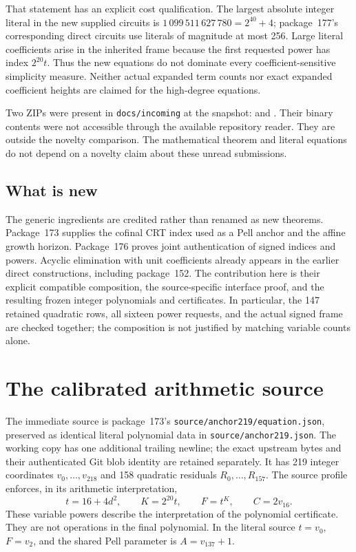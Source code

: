 \documentclass[11pt]{article}
\theoremstyle{definition}\newtheorem{definition}[theorem]{Definition}
\theoremstyle{remark}\newtheorem{remark}[theorem]{Remark}
\begin{document}
That statement has an explicit cost qualification. The largest absolute
integer literal in the new supplied circuits is
$1\,099\,511\,627\,780=2^{40}+4$; package~177's corresponding direct
circuits use literals of magnitude at most 256. Large literal
coefficients arise in the inherited frame because the first requested
power has index $2^{20}t$. Thus the new equations do not dominate every
coefficient-sensitive simplicity measure. Neither actual expanded term
counts nor exact expanded coefficient heights are claimed for the
high-degree equations.

Two ZIPs were present in \texttt{docs/incoming} at the snapshot:
 and
.
Their binary contents were not accessible through the available
repository reader. They are outside the novelty comparison. The
mathematical theorem and literal equations do not depend on a novelty
claim about these unread submissions.

\subsection{What is new}
The generic ingredients are credited rather than renamed as new
theorems. Package~173 supplies the cofinal CRT index used as a Pell
anchor and the affine growth horizon. Package~176 proves joint
authentication of signed indices and powers. Acyclic elimination with
unit coefficients already appears in the earlier direct constructions,
including package~152. The contribution here is their explicit compatible
composition, the source-specific interface proof, and the resulting
frozen integer polynomials and certificates. In particular, the
147 retained quadratic rows, all sixteen power requests, and the actual
signed frame are checked together; the composition is not justified by
matching variable counts alone.

\section{The calibrated arithmetic source}
\label{sec:source}

The immediate source is package~173's
\texttt{source/anchor219/equation.json}, preserved as identical literal
polynomial data in \texttt{source/anchor219.json}. The working copy has
one additional trailing newline; the exact upstream bytes and their
authenticated Git blob identity are retained separately. It has 219 integer coordinates
$v_0,\ldots,v_{218}$ and 158 quadratic residuals $R_0,\ldots,R_{157}$.
The source profile enforces, in its arithmetic interpretation,
\[
 t=16+4d^2,\qquad K=2^{20}t,\qquad F=t^K,\qquad C=2v_{16}.
\]
These variable powers describe the interpretation of the polynomial
certificate. They are not operations in the final polynomial. In the
literal source $t=v_0$, $F=v_2$, and the shared Pell parameter is
$A=v_{137}+1$.
\end{document}
